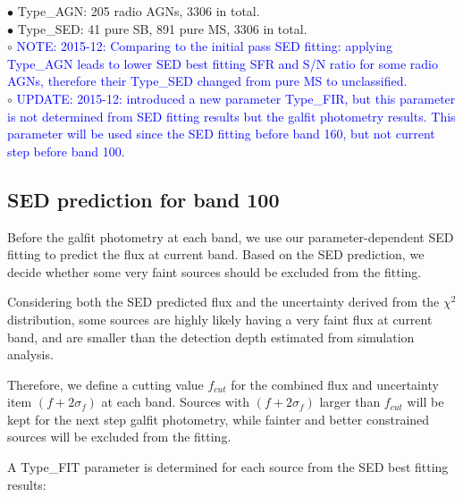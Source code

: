 \documentclass[11pt,a4paper]{article}
\begin{document}
\indent\hspace{15pt}$\bullet$ 
Type\_AGN: 205 radio AGNs, 3306 in total. 
\\
\indent\hspace{15pt}$\bullet$ 
Type\_SED: 41 pure SB, 891 pure MS, 3306 in total. 
\\
\indent\hspace{15pt}$\circ$ 
\textcolor{blue}{NOTE: 2015-12: Comparing to the initial pass SED fitting: applying Type\_AGN leads to lower SED best fitting SFR and S/N ratio for some radio AGNs, therefore their Type\_SED changed from pure MS to unclassified.}
\\
\indent\hspace{15pt}$\circ$ 
\textcolor{blue}{UPDATE: 2015-12: introduced a new parameter Type\_FIR, but this parameter is not determined from SED fitting results but the galfit photometry results. This parameter will be used since the SED fitting before band 160, but not current step before band 100.}
\\


\subsection{SED prediction for band 100}
\label{Band100_Galpre}

Before the galfit photometry at each band, we use our parameter-dependent SED fitting to predict the flux at current band. Based on the SED prediction, we decide whether some very faint sources should be excluded from the fitting. 

Considering both the SED predicted flux and the uncertainty derived from the $\chi^2$ distribution, some sources are highly likely having a very faint flux at current band, and are smaller than the detection depth estimated from simulation analysis. 

Therefore, we define a cutting value $f_{cut}$ for the combined flux and uncertainty item $(f+2\sigma_{f})$ at each band. Sources with $(f+2\sigma_{f})$ larger than $f_{cut}$ will be kept for the next step galfit photometry, while fainter and better constrained sources will be excluded from the fitting.

A Type\_FIT parameter is determined for each source from the SED best fitting results:
\end{document}
